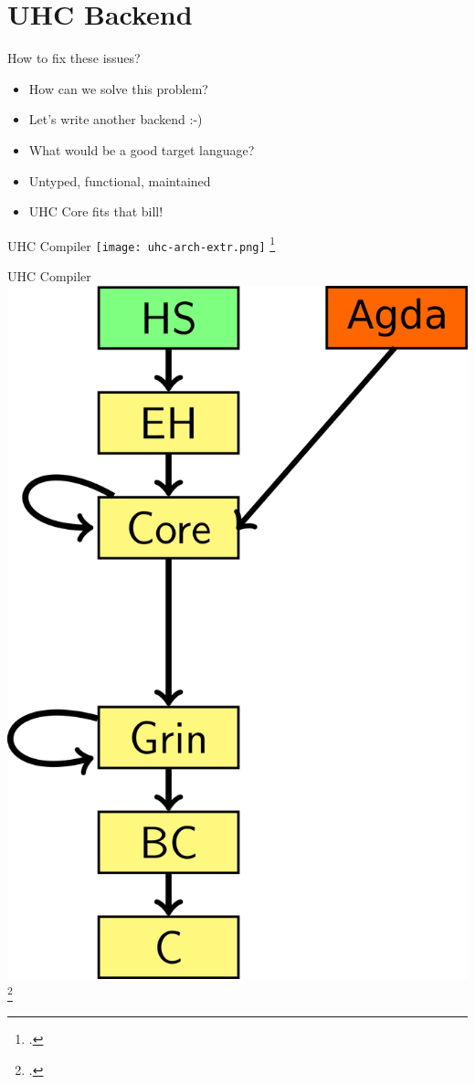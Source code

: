 \section{UHC Backend}

\begin{frame}{How to fix these issues?}
\begin{itemize}
\item How can we solve this problem?
\pause \item Let's write another backend :-)
\pause \item What would be a good target language?
\pause \item Untyped, functional, maintained
\pause \item UHC Core fits that bill!
\end{itemize}
\end{frame}

\begin{frame}[fragile]{UHC Compiler}
\hspace{3cm}
\texttt{[image: uhc-arch-extr.png]}
\footcite{dijkstra2009architecture}
\end{frame}

\begin{frame}[fragile]{UHC Compiler}
\hspace{3cm}
\includegraphics{uhc-arch-extr-mod.png}
\footcite{dijkstra2009architecture}
\end{frame}


